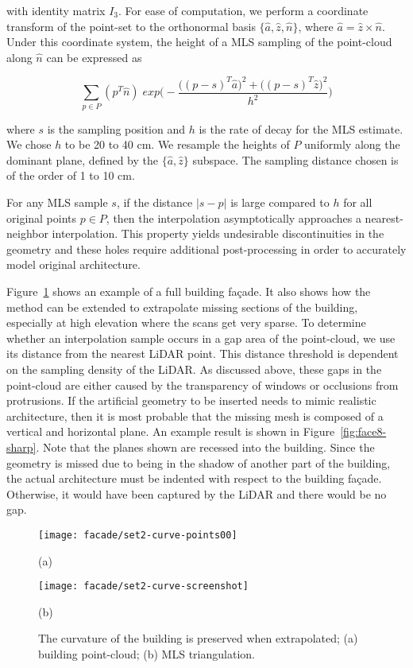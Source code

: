 \documentclass[journal]{IEEEtran}
\begin{document}
with identity matrix $I_3$.  For ease of computation, we perform a coordinate transform of the point-set to the orthonormal basis $\{ \hat{a}, \hat{z}, \hat{n} \}$, where $\hat{a} = \hat{z} \times \hat{n}$.  Under this coordinate system, the height of a MLS sampling of the point-cloud along $\hat{n}$ can be expressed as

\begin{equation}
\sum_{p \in P} (p^T \hat{n}) \; exp\Big( - \dfrac{\big( (p-s)^T \hat{a} \big)^2 + \big( (p-s)^T \hat{z} \big)^2 }{h^2} \Big)
\end{equation}

where $s$ is the sampling position and $h$ is the rate of decay for the MLS estimate.  We chose $h$ to be 20 to 40 cm.  We resample the heights of $P$ uniformly along the dominant plane, defined by the $\{\hat{a},\hat{z}\}$ subspace. The sampling distance chosen is of the order of 1 to 10 cm.

For any MLS sample $s$, if the distance $|s-p|$ is large compared to $h$ for all original points $p \in P$, then the interpolation asymptotically approaches a nearest-neighbor interpolation.  This property yields undesirable discontinuities in the geometry and these holes require additional post-processing in order to accurately model original architecture.

Figure~\ref{fig:extrapolate} shows an example of a full building fa\c{c}ade.  It also shows how the method can be extended to extrapolate missing sections of the building, especially at high elevation where the scans get very sparse.  To determine whether an interpolation sample occurs in a gap area of the point-cloud, we use its distance from the nearest LiDAR point.  This distance threshold is dependent on the sampling density of the LiDAR.  As discussed above, these gaps in the point-cloud are either caused by the transparency of windows or occlusions from protrusions.  If the artificial geometry to be inserted needs to mimic realistic architecture, then it is most probable that the missing mesh is composed of a vertical and horizontal plane.  An example result is shown in Figure~\ref{fig:face8-sharp}.  Note that the planes shown are recessed into the building.  Since the geometry is missed due to being in the shadow of another part of the building, the actual architecture must be indented with respect to the building fa\c{c}ade.  Otherwise, it would have been captured by the LiDAR and there would be no gap.

\begin{figure}[t]

\begin{minipage}[b]{.48\linewidth}
  \centering
  \centerline{\texttt{[image: facade/set2-curve-points00]}}
  \centerline{(a)}\medskip
\end{minipage}
\hfill
\begin{minipage}[b]{.48\linewidth}
  \centering
  \centerline{\texttt{[image: facade/set2-curve-screenshot]}}
  \centerline{(b)}\medskip
\end{minipage}
%
\caption{The curvature of the building is preserved when extrapolated; (a) building point-cloud; (b) MLS triangulation.}
\label{fig:extrapolate}
%
\end{figure}
\end{document}

